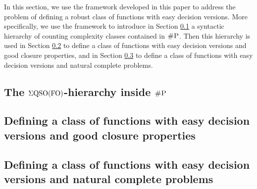 In this section, we use the framework developed in this paper to address the problem of defining a robust class of functions with easy decision versions. More specifically, we use the framework to introduce in Section \ref{sec-hier-shp} a syntactic hierarchy of counting complexity classes contained in $\text{\sc \#P}$. Then this hierarchy is used in Section \ref{sec-clo} to define a class of functions with easy decision versions and good closure properties, and in Section \ref{sec-horn} to define a class of functions with easy decision versions and 
natural complete problems.


\subsection{The $\Sigma{\rm QSO}({\rm FO})$-hierarchy inside $\text{\sc \#P}$}
\label{sec-hier-shp}


\subsection{Defining a class of functions with easy decision versions and good closure properties}
\label{sec-clo}


\subsection{Defining a class of functions with easy decision versions and natural complete problems}
\label{sec-horn}



